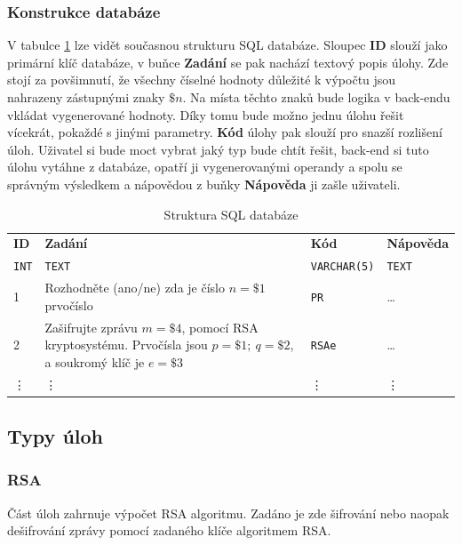 \documentclass[titlepage]{article}
\begin{document}
\subsubsection{Konstrukce databáze}
V tabulce \ref{tab:struktura_databaze} lze vidět současnou strukturu SQL databáze. Sloupec \textbf{ID} slouží jako primární klíč databáze, v buňce \textbf{Zadání} se pak nachází textový popis úlohy. Zde stojí za povšimnutí, že všechny číselné hodnoty důležité k výpočtu jsou nahrazeny zástupnými znaky $\$n$. Na místa těchto znaků bude logika v back-endu vkládat vygenerované hodnoty. Díky tomu bude možno jednu úlohu řešit vícekrát, pokaždé s jinými parametry. \textbf{Kód} úlohy pak slouží pro snazší rozlišení úloh. Uživatel si bude moct vybrat jaký typ bude chtít řešit, back-end si tuto úlohu vytáhne z databáze, opatří ji vygenerovanými operandy a spolu se správným výsledkem a nápovědou z buňky \textbf{Nápověda} ji zašle uživateli.  
 \begin{table}
    \centering
    \caption{Struktura SQL databáze}
    \label{tab:struktura_databaze}
    \vspace{.5em}
    \begin{tabular}[h]{| l | p{6cm} | l | l |}
        \hline
        \textbf{ID} & \textbf{Zadání} & \textbf{Kód} & \textbf{Nápověda} \\
        \texttt{INT} & \texttt{TEXT} & \texttt{VARCHAR(5)} & \texttt{TEXT} \\
        \hline\hline
        1 & Rozhodněte (ano/ne) zda je číslo $n=\$1$ prvočíslo & \texttt{PR} & \dots \\
        \hline
        2 & Zašifrujte zprávu $m=\$4$, pomocí RSA kryptosystému. Prvočísla jsou $p=\$1;\ q=\$2$, a soukromý klíč je $e=\$3$ & \texttt{RSAe} & \dots\\
        \hline
        \vdots & \vdots & \vdots & \vdots \\
        \hline
    \end{tabular}
 \end{table}
    

\subsection{Typy úloh}
\subsubsection{RSA}
Část  úloh zahrnuje výpočet RSA algoritmu. Zadáno je zde šifrování nebo naopak dešifrování zprávy pomocí zadaného klíče algoritmem RSA.
\end{document}
